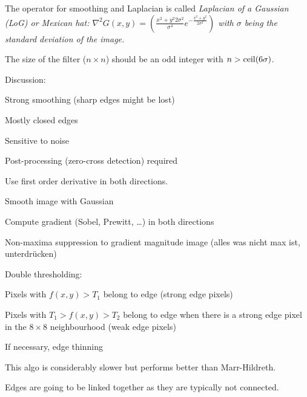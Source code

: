       The operator for smoothing and Laplacian is called \em Laplacian of a Gaussian (LoG) \em or \em Mexican hat\em:
      $\nabla^2G(x,y) = \left( \frac{x^2 + y^2 2\sigma^2}{\sigma^4} e^{-\frac{x^2+y^2}{2\sigma^2}} \right)$
      with $\sigma$ being the standard deviation of the image.
      
      The size of the filter ($n \times n$) should be an odd integer with $n > \operatorname{ceil}(6 \sigma)$.
     
      Discussion:
      \begin{liste}
      	\item Strong smoothing (sharp edges might be lost)
      	\item Mostly closed edges
      	\item Sensitive to noise
      	\item Post-processing (zero-cross detection) required
      \end{liste}
  
      Use first order derivative in both directions.
      
      \begin{aufzaehlung}
      	\item Smooth image with Gaussian
      	\item Compute gradient (Sobel, Prewitt, \ldots) in both directions
      	\item Non-maxima suppression to gradient magnitude image (alles was nicht max ist, unterdrücken)
      	\item Double thresholding:
      	  \begin{liste}
      	  	\item Pixels with $f(x,y) > T_1$ belong to edge (strong edge pixels)
      	  	\item Pixels with $T_1 > f(x,y) > T_2$ belong to edge when there is a strong edge pixel
      	  	in the $8\times 8$ neighbourhood (weak edge pixels)
      	  \end{liste}
      	\item If necessary, edge thinning
      \end{aufzaehlung}
      This algo is considerably slower but performs better than Marr-Hildreth.
      
      Edges are going to be linked together as they are typically not connected.
      
